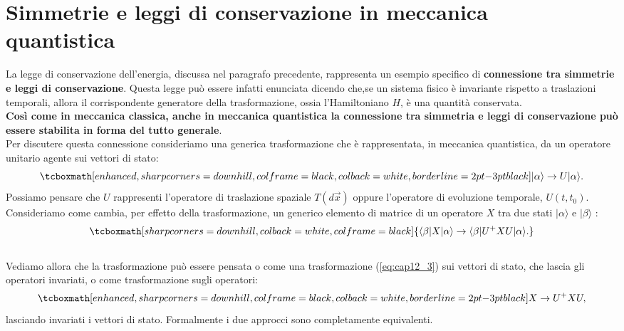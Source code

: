 \section[Simmetrie e leggi di conservazione  in meccanica quantistica]{Simmetrie e leggi di conservazione  in meccanica \\quantistica} 

La legge di conservazione dell'energia, discussa nel paragrafo precedente, rappresenta un esempio specifico di \textbf{connessione tra simmetrie e leggi di conservazione}. Questa legge può essere infatti enunciata dicendo che,se un sistema fisico è invariante rispetto a traslazioni temporali, allora il corrispondente generatore della trasformazione, ossia l'Hamiltoniano $H$, è una quantità conservata.\\

\textbf{Così come in meccanica classica, anche in meccanica quantistica la connessione tra simmetria e leggi di conservazione può essere stabilita in forma del tutto generale}.\\

Per discutere questa connessione consideriamo una generica trasformazione che è rappresentata, in meccanica quantistica, da un operatore unitario agente sui vettori di stato:
	\begin{equation}
	\label{eq:cap12_3}
		\tcboxmath[enhanced, sharp corners=downhill, colframe=black, colback=white, borderline={2pt}{-3pt}{black}]{
			|\alpha \rangle \rightarrow {U}|\alpha \rangle.
			}
	\end{equation}
Possiamo pensare che ${U}$ rappresenti l'operatore di traslazione spaziale $T(d\vec{x})$ oppure l'operatore di evoluzione temporale, ${U}(t,t_0)$.\\

Consideriamo come cambia, per effetto della trasformazione, un generico elemento di matrice di un operatore ${X}$ tra due stati $|\alpha \rangle$ e $|\beta\rangle$ :
	\begin{equation}
		\tcboxmath[sharp corners=downhill, colback=white, colframe=black]{
			\langle \beta|{X}|\alpha \rangle   \rightarrow    \langle \beta |{U}^+{X}{U}|\alpha \rangle.
			}
	\end{equation}\\

Vediamo allora che la trasformazione può essere pensata o come una trasformazione (\ref{eq:cap12_3})  sui vettori di stato, che lascia gli operatori invariati, o come trasformazione sugli operatori:
	\begin{equation}
	\label{eq:cap12_4}
		\tcboxmath[enhanced, sharp corners=downhill, colframe=black, colback=white, borderline={2pt}{-3pt}{black}]{
		{X}\rightarrow {U}^+ {X}{U},}
	\end{equation}
lasciando invariati i vettori di stato. Formalmente i due approcci sono completamente equivalenti.\\

